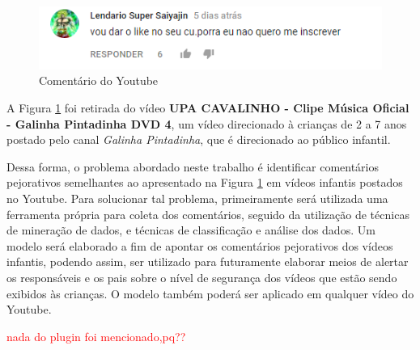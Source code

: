 \begin{figure}[H] %
	\caption{\label{fig:youtube_comment} Comentário do Youtube}
	\begin{center}
	    \includegraphics[scale=1]{figuras/figura_1.png} %
	\end{center}
\end{figure}

A Figura \ref{fig:youtube_comment} foi retirada do vídeo \textbf{UPA CAVALINHO - Clipe Música Oficial - Galinha Pintadinha DVD 4}, um vídeo direcionado à crianças de 2 a 7 anos postado pelo canal \emph{Galinha Pintadinha}, que é direcionado ao público infantil. %


Dessa forma, o problema abordado neste trabalho é identificar comentários pejorativos semelhantes ao apresentado na Figura \ref{fig:youtube_comment} em vídeos infantis postados no Youtube. Para solucionar tal problema, primeiramente será utilizada uma ferramenta própria para coleta dos comentários, seguido da utilização de técnicas de mineração de dados, e técnicas de classificação e análise dos dados. Um modelo será elaborado a fim de apontar os comentários pejorativos dos vídeos infantis, podendo assim, ser utilizado para futuramente elaborar meios de alertar os responsáveis e os pais sobre o nível de segurança dos vídeos que estão sendo exibidos às crianças. O modelo também poderá ser aplicado em qualquer vídeo do Youtube.  %

\textcolor{red}{nada do plugin foi mencionado,pq??}


